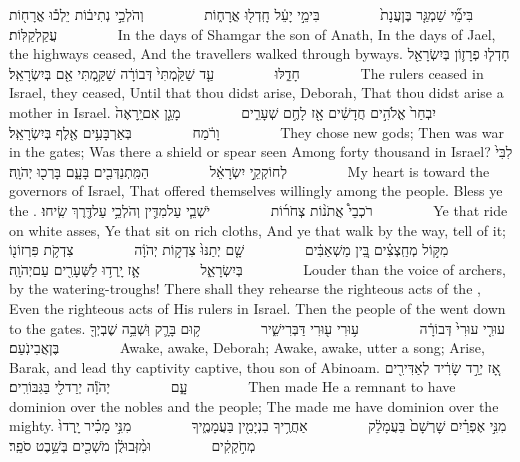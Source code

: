 {בִּימֵ֞י שַׁמְגַּ֤ר בֶּן\maqqaf עֲנָת֙         בִּימֵ֣י יָעֵ֔ל חָֽדְל֖וּ אֳרָח֑וֹת         וְהֹלְכֵ֣י נְתִיב֔וֹת יֵלְכ֕וּ אֳרָח֖וֹת עֲקַלְקַלּֽוֹת׃        }
{In the days of Shamgar the son of Anath, In the days of Jael, the highways ceased, And the travellers walked through byways.}
{חָדְל֧וּ פְרָז֛וֹן בְּיִשְׂרָאֵ֖ל חָדֵ֑לּוּ         עַ֤ד שַׁקַּ֙מְתִּי֙ דְּבוֹרָ֔ה שַׁקַּ֥מְתִּי אֵ֖ם בְּיִשְׂרָאֵֽל׃        }
{The rulers ceased in Israel, they ceased, Until that thou didst arise, Deborah, That thou didst arise a mother in Israel.}
{יִבְחַר֙ אֱלֹהִ֣ים חֲדָשִׁ֔ים אָ֖ז לָחֶ֣ם שְׁעָרִ֑ים         מָגֵ֤ן אִם\maqqaf יֵֽרָאֶה֙ וָרֹ֔מַח         בְּאַרְבָּעִ֥ים אֶ֖לֶף בְּיִשְׂרָאֵֽל׃        }
{They chose new gods; Then was war in the gates; Was there a shield or spear seen Among forty thousand in Israel?}
{לִבִּי֙ לְחוֹקְקֵ֣י יִשְׂרָאֵ֔ל         הַמִּֽתְנַדְּבִ֖ים בָּעָ֑ם בָּרְכ֖וּ יְהֹוָֽה׃        }
{My heart is toward the governors of Israel, That offered themselves willingly among the people. Bless ye the \lord.}
{רֹכְבֵי֩ אֲתֹנ֨וֹת צְחֹר֜וֹת         יֹשְׁבֵ֧י עַל\maqqaf מִדִּ֛ין וְהֹלְכֵ֥י עַל\maqqaf דֶּ֖רֶךְ שִֽׂיחוּ׃        }
{Ye that ride on white asses, Ye that sit on rich cloths, And ye that walk by the way, tell of it;}
{מִקּ֣וֹל מְחַֽצְצִ֗ים בֵּ֚ין מַשְׁאַבִּ֔ים         שָׁ֤ם יְתַנּוּ֙ צִדְק֣וֹת יְהֹוָ֔ה         צִדְקֹ֥ת פִּרְזוֹנ֖וֹ בְּיִשְׂרָאֵ֑ל         אָ֛ז יָֽרְד֥וּ לַשְּׁעָרִ֖ים עַם\maqqaf יְהֹוָֽה׃        }
{Louder than the voice of archers, by the watering-troughs! There shall they rehearse the righteous acts of the \lord, Even the righteous acts of His rulers in Israel. Then the people of the \lord\space went down to the gates.}
{עוּרִ֤י עוּרִי֙ דְּבוֹרָ֔ה         ע֥וּרִי ע֖וּרִי דַּבְּרִי\maqqaf שִׁ֑יר         ק֥וּם בָּרָ֛ק וּֽשְׁבֵ֥ה שֶׁבְיְךָ֖ בֶּן\maqqaf אֲבִינֹֽעַם׃        }
{Awake, awake, Deborah; Awake, awake, utter a song; Arise, Barak, and lead thy captivity captive, thou son of Abinoam.}
{אָ֚ז יְרַ֣ד שָׂרִ֔יד לְאַדִּירִ֖ים עָ֑ם         יְהֹוָ֕ה יְרַד\maqqaf לִ֖י בַּגִּבּוֹרִֽים׃        }
{Then made He a remnant to have dominion over the nobles and the people; The \lord\space made me have dominion over the mighty.}
{מִנִּ֣י אֶפְרַ֗יִם שׇׁרְשָׁם֙ בַּעֲמָלֵ֔ק         אַחֲרֶ֥יךָ בִנְיָמִ֖ין בַּעֲמָמֶ֑יךָ         מִנִּ֣י מָכִ֗יר יָֽרְדוּ֙ מְחֹ֣קְקִ֔ים         וּמִ֨זְּבוּלֻ֔ן מֹשְׁכִ֖ים בְּשֵׁ֥בֶט סֹפֵֽר׃        }
